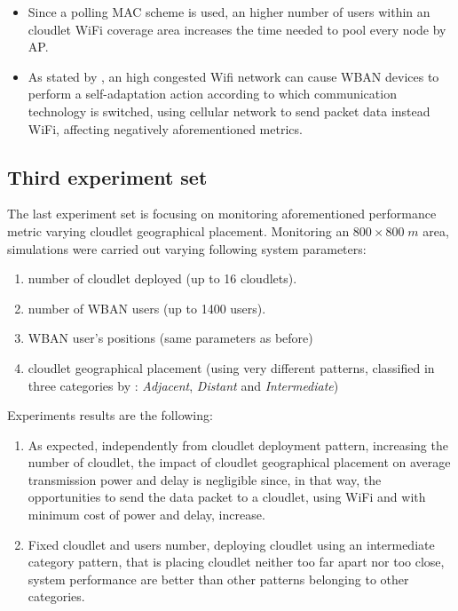 \documentclass[sigchi]{acmart}
\begin{document}
\begin{enumerate}
\begin{itemize}
\item Since a polling MAC scheme is used, an higher number of users within an cloudlet WiFi coverage area increases the time needed to pool every node by AP. 

\item As stated by \citep{MSAReport}, an high congested Wifi network can cause WBAN devices to perform a self-adaptation action according to which communication technology is switched, using cellular network to send packet data instead WiFi, affecting negatively aforementioned metrics.
\end{itemize}

\end{enumerate}

\subsection{Third experiment set}

The last experiment set is focusing on monitoring aforementioned performance metric varying cloudlet geographical placement. Monitoring an $800 \times 800 \; m$ area, simulations were carried out varying following system parameters:

\begin{enumerate}
\item number of cloudlet deployed (up to 16 cloudlets).
\item number of WBAN users (up to 1400 users).
\item WBAN user's positions (same parameters as before)
\item cloudlet geographical placement (using very different patterns, classified in three categories by \citet{MSAReport}: \textit{Adjacent}, \textit{Distant} and \textit{Intermediate})
\end{enumerate}

Experiments results are the following:

\begin{enumerate}

\item As expected, independently from cloudlet deployment pattern, increasing the number of cloudlet, the impact of cloudlet geographical placement on average transmission power and delay is negligible since, in that way, the opportunities to send the data packet to a cloudlet, using WiFi and with minimum cost of power and delay, increase.

\item Fixed cloudlet and users number, deploying cloudlet using an intermediate category pattern, that is placing cloudlet neither too far apart nor too close, system performance are better than other patterns belonging to other categories.

\end{enumerate}
\end{document}
